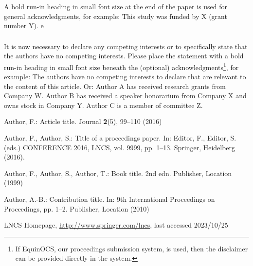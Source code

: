 \documentclass[runningheads]{llncs}
\begin{document}
\begin{credits}
    \subsubsection{\ackname} A bold run-in heading in small font size at the end of the paper is
    used for general acknowledgments, for example: This study was funded
    by X (grant number Y).
    e
    \subsubsection{\discintname}
    It is now necessary to declare any competing interests or to specifically
    state that the authors have no competing interests. Please place the
    statement with a bold run-in heading in small font size beneath the
    (optional) acknowledgments\footnote{If EquinOCS, our proceedings submission
    system, is used, then the disclaimer can be provided directly in the system.},
    for example: The authors have no competing interests to declare that are
    relevant to the content of this article. Or: Author A has received research
    grants from Company W. Author B has received a speaker honorarium from
    Company X and owns stock in Company Y. Author C is a member of committee Z.
    \end{credits}
    


% 
% 

\begin{thebibliography}{8}
Author, F.: Article title. Journal \textbf{2}(5), 99--110 (2016)

Author, F., Author, S.: Title of a proceedings paper. In: Editor,
F., Editor, S. (eds.) CONFERENCE 2016, LNCS, vol. 9999, pp. 1--13.
Springer, Heidelberg (2016). 

Author, F., Author, S., Author, T.: Book title. 2nd edn. Publisher,
Location (1999)

Author, A.-B.: Contribution title. In: 9th International Proceedings
on Proceedings, pp. 1--2. Publisher, Location (2010)

LNCS Homepage, \url{http://www.springer.com/lncs}, last accessed 2023/10/25
\end{thebibliography}
\end{document}
